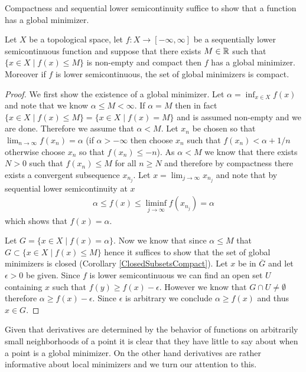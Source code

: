 Compactness and sequential lower semicontinuity suffice to show that
a function has a global minimizer.
\begin{thm}\label{ExistenceGlobalMinimizerLowerSemicontinuous}Let $X$ be a topological space, let $f : X \to [-\infty,
  \infty]$ be a sequentially lower
  semicontinuous function and suppose that there exists $M \in \mathbb{R}$
  such that $\lbrace x \in X \mid f(x) \leq M \rbrace$ is non-empty
  and compact then
  $f$ has a global minimizer.  Moreover if $f$ is lower
  semicontinuous, the set of global minimizers
  is compact.
\end{thm}
\begin{proof}
We first show the existence of a global minimizer.  Let $\alpha = \inf_{x \in X} f(x)$ and note that we know $\alpha \leq
M < \infty$.  If $\alpha = M$ then in fact $\lbrace x \in X \mid f(x)
\leq M \rbrace  = \lbrace x \in X \mid f(x) = M \rbrace $ and is assumed
non-empty and we are done.  Therefore we assume that $\alpha < M$.  Let $x_n$ be chosen so that
$\lim_{n \to \infty} f(x_n) = \alpha$ (if $\alpha > -\infty$ then
choose $x_n$ such that $f(x_n) < \alpha + 1/n$ otherwise choose $x_n$
so that $f(x_n) \leq -n$).  As $\alpha < M$ we know that there exists
$N>0$ such that $f(x_n) \leq M$ for all $n \geq N$ and therefore by
compactness there exists a convergent subsequence $x_{n_j}$.  Let $x =
\lim_{j \to \infty} x_{n_j}$ and note that by sequential lower semicontinuity
at $x$
\begin{align*}
\alpha \leq f(x) \leq \liminf_{j \to \infty} f(x_{n_j}) = \alpha
\end{align*}
which shows that $f(x) = \alpha$.

Let $G = \lbrace x \in X \mid f(x) = \alpha \rbrace$.  Now we know
that since $\alpha \leq M$  that $G \subset \lbrace x \in X \mid f(x)
\leq M \rbrace$ hence it suffices to show that the set of global
minimizers is closed (Corollary \ref{ClosedSubsetsCompact}).  Let $x$
be in $\overline{G}$ and let $\epsilon > 0$ be given.  Since $f$ is
lower semicontinuous we can find an open set $U$ containing $x$ such
that $f(y) \geq f(x) - \epsilon$.  However we know that $G \cap U \neq
\emptyset$ therefore $\alpha \geq f(x) - \epsilon$.  Since $\epsilon$
is arbitrary we conclude $\alpha \geq f(x)$ and thus $x \in G$.  
\end{proof}


Given that derivatives are determined by the behavior of functions on
arbitrarily small neighborhoods of a point it is clear that they have
little to say about when a point is a global minimizer.  On the other
hand derivatives are rather informative about local minimizers and we
turn our attention to this.

